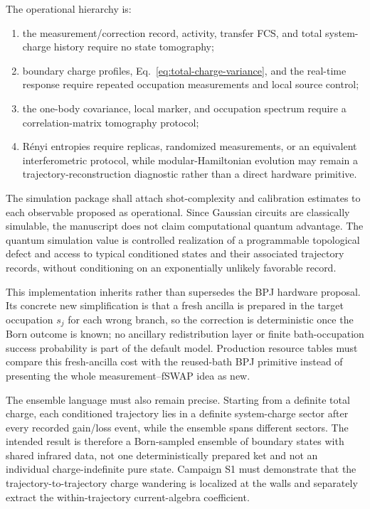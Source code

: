 \documentclass[aps,prx,onecolumn,nofootinbib,superscriptaddress,longbibliography]{revtex4-2}
\begin{document}
The operational hierarchy is:
\begin{enumerate}
\item the measurement/correction record, activity, transfer FCS, and total system-charge
      history require no state tomography;
\item boundary charge profiles, Eq.~\eqref{eq:total-charge-variance}, and the real-time
      response require repeated occupation measurements and local source control;
\item the one-body covariance, local marker, and occupation spectrum require a
      correlation-matrix tomography protocol;
\item R\'enyi entropies require replicas, randomized measurements, or an equivalent
      interferometric protocol, while modular-Hamiltonian evolution may remain a
      trajectory-reconstruction diagnostic rather than a direct hardware primitive.
\end{enumerate}
The simulation package shall attach shot-complexity and calibration estimates to each
observable proposed as operational.  Since Gaussian circuits are classically
simulable, the manuscript does not claim computational quantum advantage.  The quantum
simulation value is controlled realization of a programmable topological defect and access
to typical conditioned states and their associated trajectory records, without conditioning on an
exponentially unlikely favorable record.

This implementation inherits rather than supersedes the BPJ hardware proposal.  Its concrete
new simplification is that a fresh ancilla is prepared in the target occupation $s_j$ for
each wrong branch, so the correction is deterministic once the Born outcome is known; no
ancillary redistribution layer or finite bath-occupation success probability is part of
the default model.  Production resource tables must compare this fresh-ancilla cost with
the reused-bath BPJ primitive instead of presenting the whole measurement--fSWAP idea as
new.

The ensemble language must also remain precise.  Starting from a definite total charge,
each conditioned trajectory lies in a definite system-charge sector after every recorded
gain/loss event, while the ensemble spans different sectors.  The intended result is
therefore a Born-sampled ensemble of boundary states with shared infrared data, not one
deterministically prepared ket and not an individual charge-indefinite pure state.  Campaign
S1 must demonstrate that the trajectory-to-trajectory charge wandering is localized at the
walls and separately extract the within-trajectory current-algebra coefficient.
\end{document}
